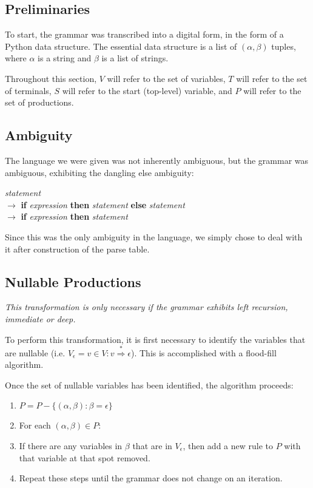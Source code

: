 \documentclass[titlepage]{article}
\newcommand{\deriv}{\overset{*}{\Rightarrow}}
\newcommand{\ep}{\epsilon}
\begin{document}
		\subsection{Preliminaries}
		To start, the grammar was transcribed into a digital form, in the form of a Python data structure. The essential data structure is a list of $(\alpha, \beta)$ tuples, where $\alpha$ is a string and $\beta$ is a list of strings.

		Throughout this section, $V$ will refer to the set of variables, $T$ will refer to the set of terminals, $S$ will refer to the start (top-level) variable, and $P$ will refer to the set of productions.

		\subsection{Ambiguity}
		The language we were given was not inherently ambiguous, but the grammar was ambiguous, exhibiting the dangling else ambiguity:

		\begin{center}
		\parbox{10cm}{
			\textit{statement} \\
			\phantom{1in} $\rightarrow$ \textbf{if} \textit{expression} \textbf{then} \textit{statement} \textbf{else} \textit{statement} \\
			\phantom{1in} $\rightarrow$ \textbf{if} \textit{expression} \textbf{then} \textit{statement}
		}
		\end{center}

		\noindent Since this was the only ambiguity in the language, we simply chose to deal with it after construction of the parse table.

		\subsection{Nullable Productions}
		\emph{This transformation is only necessary if the grammar exhibits left recursion, immediate or deep.}

		To perform this transformation, it is first necessary to identify the variables that are nullable (i.e. $V_\ep = {v \in V: v \deriv \ep}$). This is accomplished with a flood-fill algorithm.

		Once the set of nullable variables has been identified, the algorithm proceeds:
		\begin{enumerate}
			\item $P = P - \{(\alpha, \beta) : \beta = \ep\}$
			\item For each $(\alpha, \beta) \in P$:
			\item If there are any variables in $\beta$ that are in $V_\ep$, then add a new rule to $P$ with that variable at that spot removed.
			\item Repeat these steps until the grammar does not change on an iteration.
		\end{enumerate}
\end{document}
